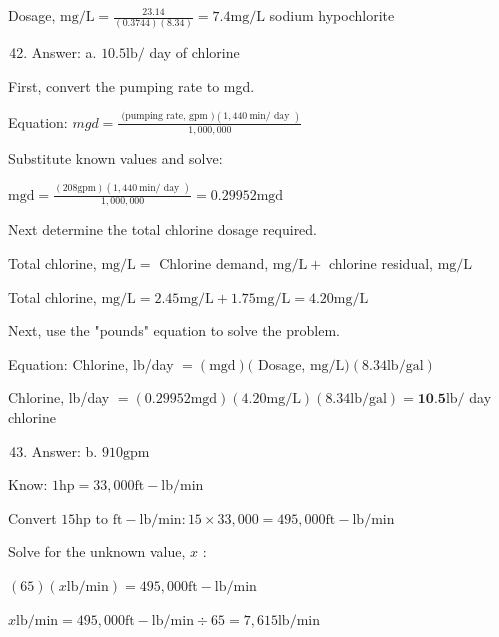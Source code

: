 \documentclass[10pt]{article}
\begin{document}
Dosage, $\mathrm{mg} / \mathrm{L}=\frac{23.14}{(0.3744)(8.34)}=7.4 \mathrm{mg} / \mathrm{L}$ sodium hypochlorite

\begin{enumerate}
  \setcounter{enumi}{41}
  \item Answer: a. $10.5 \mathrm{lb} /$ day of chlorine
\end{enumerate}

First, convert the pumping rate to mgd.

Equation: $m g d=\frac{\text { (pumping rate, gpm })(1,440 \mathrm{~min} / \text { day })}{1,000,000}$

Substitute known values and solve:

$\mathrm{mgd}=\frac{(208 \mathrm{gpm})(1,440 \mathrm{~min} / \text { day })}{1,000,000}=0.29952 \mathrm{mgd}$

Next determine the total chlorine dosage required.

Total chlorine, $\mathrm{mg} / \mathrm{L}=$ Chlorine demand, $\mathrm{mg} / \mathrm{L}+$ chlorine residual, $\mathrm{mg} / \mathrm{L}$

Total chlorine, $\mathrm{mg} / \mathrm{L}=2.45 \mathrm{mg} / \mathrm{L}+1.75 \mathrm{mg} / \mathrm{L}=4.20 \mathrm{mg} / \mathrm{L}$

Next, use the "pounds" equation to solve the problem.

Equation: Chlorine, lb/day $=(\mathrm{mgd})($ Dosage, $\mathrm{mg} / \mathrm{L})(8.34 \mathrm{lb} / \mathrm{gal})$

Chlorine, lb/day $=(0.29952 \mathrm{mgd})(4.20 \mathrm{mg} / \mathrm{L})(8.34 \mathrm{lb} / \mathrm{gal})=\mathbf{1 0 . 5} \mathrm{lb} /$ day chlorine

\begin{enumerate}
  \setcounter{enumi}{42}
  \item Answer: b. $910 \mathrm{gpm}$
\end{enumerate}

Know: $1 \mathrm{hp}=33,000 \mathrm{ft}-\mathrm{lb} / \mathrm{min}$

Convert $15 \mathrm{hp}$ to $\mathrm{ft}-\mathrm{lb} / \mathrm{min}: 15 \times 33,000=495,000 \mathrm{ft}-\mathrm{lb} / \mathrm{min}$

Solve for the unknown value, $x$ :

$(65)(x \mathrm{lb} / \mathrm{min})=495,000 \mathrm{ft}-\mathrm{lb} / \mathrm{min}$

$x \mathrm{lb} / \mathrm{min}=495,000 \mathrm{ft}-\mathrm{lb} / \mathrm{min} \div 65=7,615 \mathrm{lb} / \mathrm{min}$
\end{document}
